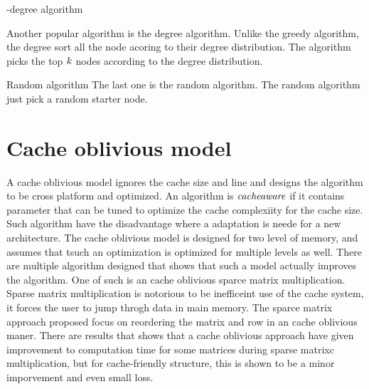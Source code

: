 -degree algorithm

Another popular algorithm is the degree algorithm\cite{MaximizeSpread2015}. Unlike the greedy algorithm, the degree sort all the node acoring to their degree distribution. The algorithm picks the top $\it{k}$ nodes according to the degree distribution. 



Random algorithm
The last one is the random algorithm. The random algorithm just pick a random starter node. 


\section{Cache oblivious model} 
A cache oblivious model ignores the cache size and line and designs the algorithm to be cross platform and optimized. An algorithm is $\it{cache aware}$ if it contains parameter that can be tuned to optimize the cache complexiity for the cache size\cite{CacheObli1999}. Such algorithm have the disadvantage where a adaptation is neede for a new architecture\cite{COmultiplic2009}. The cache oblivious model is designed for two level of memory, and assumes that tsuch an optimization is optimized for multiple levels as well. There are multiple algorithm designed that shows that such a model actually improves the algorithm. One of such is an cache oblivious sparce matrix multiplication. Sparse matrix multiplication is notorious to be inefficeint use of the cache system, it forces the user to jump throgh data in main memory\cite{COmuliplic2009}. The sparce matrix approach proposed \cite{COmultiplic2009} focus on reordering the matrix and row in an cache oblivious maner. There are results that shows that a cache oblivious approach have given improvement to computation time for some matrices during sparse matrixc multiplication, but for cache-friendly structure, this is shown to be a minor imporvement and even small loss. 